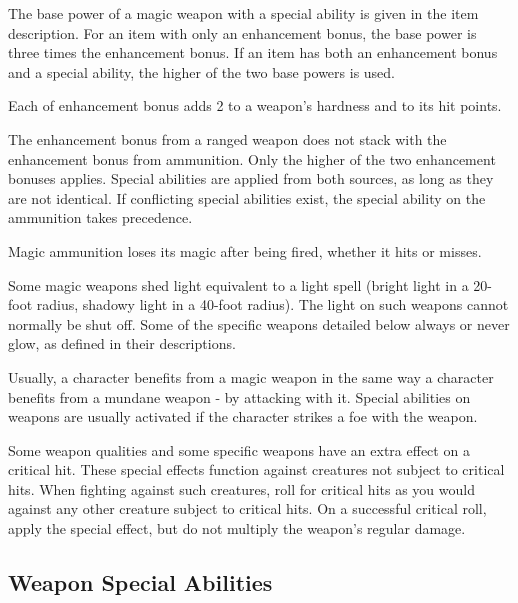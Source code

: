              The base power of a magic weapon with a special ability is given in the item description.
            For an item with only an enhancement bonus, the base power is three times the enhancement bonus.
            If an item has both an enhancement bonus and a special ability, the higher of the two base powers is used.

             Each  of enhancement bonus adds 2 to a weapon's hardness and  to its hit points.

             The enhancement bonus from a ranged weapon does not stack with the enhancement bonus from ammunition.
            Only the higher of the two enhancement bonuses applies.
            Special abilities are applied from both sources, as long as they are not identical.
            If conflicting special abilities exist, the special ability on the ammunition takes precedence.

            Magic ammunition loses its magic after being fired, whether it hits or misses.

             Some magic weapons shed light equivalent to a light spell (bright light in a 20-foot radius, shadowy light in a 40-foot radius).
            The light on such weapons cannot normally be shut off.
            Some of the specific weapons detailed below always or never glow, as defined in their descriptions.

             Usually, a character benefits from a magic weapon in the same way a character benefits from a mundane weapon - by attacking with it.
            Special abilities on weapons are usually activated if the character strikes a foe with the weapon.

             Some weapon qualities and some specific weapons have an extra effect on a critical hit.
            These special effects function against creatures not subject to critical hits.
            When fighting against such creatures, roll for critical hits as you would against any other creature subject to critical hits.
            On a successful critical roll, apply the special effect, but do not multiply the weapon's regular damage.

    \subsection{Weapon Special Abilities}\label{Weapon Special Abilities}

